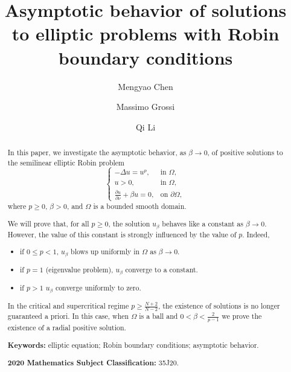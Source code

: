 \documentclass[12pt,reqno]{amsart}
\numberwithin{equation}{section}
\theoremstyle{definition}
\begin{document}
\title[Some semilinear elliptic equations with Robin boundary condition]{Asymptotic behavior of solutions to elliptic problems with Robin boundary conditions}

\author{Mengyao Chen}
\address{Mengyao Chen, School of Mathematics and Systems Science \& Hubei Province Key Laboratory of Systems Science in Metallurgical Process, Wuhan University of Science and Technology, Wuhan 430065, P. R. China.}

\author{Massimo Grossi}
\address{Massimo Grossi, Dipartimento di Matematica, Universit\`a di Roma ``La Sapienza'', P.le A. Moro 2, 00185 Roma, Italy}

\author{Qi Li}
\address{Qi Li, School of Mathematics and Systems Science \& Hubei Province Key Laboratory of Systems Science in Metallurgical Process, Wuhan University of Science and Technology, Wuhan 430065, P. R. China.}

\begin{abstract}
In this paper, we investigate the asymptotic behavior, as $\beta \to 0$, of positive solutions to the semilinear elliptic Robin problem
\begin{equation*}
\begin{cases}
-\Delta u = u^p, & \text{in } \Omega,\\
u > 0, & \text{in } \Omega,\\
\frac{\partial u}{\partial \nu} + \beta u = 0, & \text{on } \partial \Omega,
\end{cases}
\end{equation*}
where $p \ge 0$, $\beta > 0$, and $\Omega$ is a bounded smooth domain.

We will prove that, for all $p\ge0$, the solution $u_\beta$ behaves like a constant as $\beta\to0$. However, the value of this constant is strongly influenced by the value of $p$. Indeed,
\begin{itemize}
\item if $0 \le p < 1$, $u_\beta$ blows up uniformly in $\Omega$ as $\beta \to 0$.
\item if $p=1$ (eigenvalue problem),  $u_\beta$  converge to a constant.
\item if $p>1$ $u_\beta$  converge uniformly to zero.
\end{itemize}
In the critical and supercritical regime $p \ge \frac{N+2}{N-2}$, the existence of solutions is no longer guaranteed a priori. In this case, when $\Omega$ is a ball and $0<\beta<\frac{2}{p-1}$ we prove the existence of a radial positive solution.
\medskip

\noindent\textbf{Keywords:} elliptic equation; Robin boundary conditions; asymptotic behavior.

\medskip

\noindent\textbf{2020 Mathematics Subject Classification:} 35J20.

\end{abstract}
\end{document}

